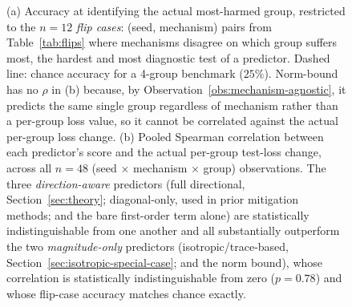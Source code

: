 \documentclass{article}
\begin{document}
\begin{figure}[t]
\centering

\caption{(a) Accuracy at identifying the actual most-harmed group, restricted to the $n=12$ \emph{flip cases}: (seed, mechanism) pairs from Table~\ref{tab:flips} where mechanisms disagree on which group suffers most, the hardest and most diagnostic test of a predictor. Dashed line: chance accuracy for a 4-group benchmark ($25\%$). Norm-bound has no $\rho$ in (b) because, by Observation~\ref{obs:mechanism-agnostic}, it predicts the same single group regardless of mechanism rather than a per-group loss value, so it cannot be correlated against the actual per-group loss change. (b) Pooled Spearman correlation between each predictor's score and the actual per-group test-loss change, across all $n=48$ (seed $\times$ mechanism $\times$ group) observations. The three \emph{direction-aware} predictors (full directional, Section~\ref{sec:theory}; diagonal-only, used in prior mitigation methods; and the bare first-order term alone) are statistically indistinguishable from one another and all substantially outperform the two \emph{magnitude-only} predictors (isotropic/trace-based, Section~\ref{sec:isotropic-special-case}; and the norm bound), whose correlation is statistically indistinguishable from zero ($p=0.78$) and whose flip-case accuracy matches chance exactly.}
\label{fig:baseline-comparison}
\end{figure}
\end{document}

